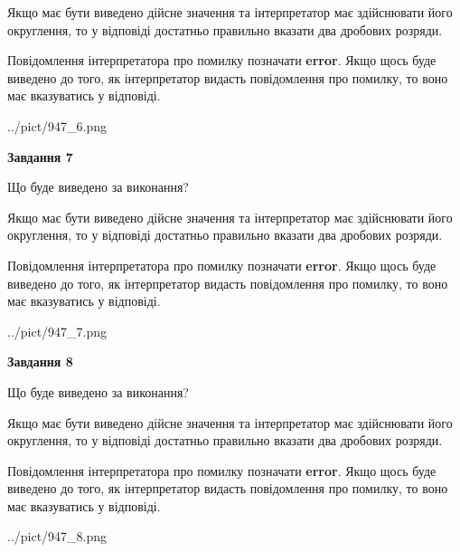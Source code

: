 \documentclass[12pt, ukrainian]{article}
\begin{document}
{\begin {Large}
Якщо має бути виведено дійсне значення та інтерпретатор має здійснювати його округлення, 
то у відповіді достатньо правильно вказати два дробових розряди.

Повідомлення інтерпретатора про помилку позначати \textbf{error}.
Якщо щось буде виведено до того, як інтерпретатор видасть повідомлення про помилку, 
то воно має вказуватись у відповіді. \par

\begin{center}
	{../pict/947_6.png}
\end{center}
\newpage

{\begin {center}\textbf{Завдання 7}\end {center}}\par
Що буде виведено за виконання? \par

Якщо має бути виведено дійсне значення та інтерпретатор має здійснювати його округлення, 
то у відповіді достатньо правильно вказати два дробових розряди.

Повідомлення інтерпретатора про помилку позначати \textbf{error}.
Якщо щось буде виведено до того, як інтерпретатор видасть повідомлення про помилку, 
то воно має вказуватись у відповіді. \par

\begin{center}
	{../pict/947_7.png}
\end{center}
\newpage

{\begin {center}\textbf{Завдання 8}\end {center}}\par
Що буде виведено за виконання? \par

Якщо має бути виведено дійсне значення та інтерпретатор має здійснювати його округлення, 
то у відповіді достатньо правильно вказати два дробових розряди.

Повідомлення інтерпретатора про помилку позначати \textbf{error}.
Якщо щось буде виведено до того, як інтерпретатор видасть повідомлення про помилку, 
то воно має вказуватись у відповіді. \par

\begin{center}
	{../pict/947_8.png}
\end{center}
\newpage


\end{Large}}
\end{document}
